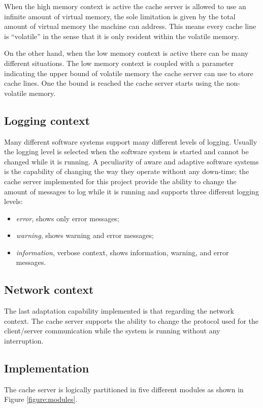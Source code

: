 \documentclass[11pt,a4paper]{article}
\begin{document}
When the high memory context is active the cache server is allowed to use an infinite amount of virtual memory, the sole limitation is given by the total amount of virtual memory the machine can address. This means every cache line is ``volatile'' in the sense that it is only resident within the volatile memory.

On the other hand, when the low memory context is active there can be many different situations. The low memory context is coupled with a parameter indicating the upper bound of volatile memory the cache server can use to store cache lines. One the bound is reached the cache server starts using the non-volatile memory.

\subsection{Logging context}
\label{section:work:logging-context}
Many different software systems support many different levels of logging. Usually the logging level is selected when the software system is started and cannot be changed while it is running. A peculiarity of aware and adaptive software systems is the capability of changing the way they operate without any down-time; the cache server implemented for this project provide the ability to change the amount of messages to log while it is running and supports three different logging levels:
\begin{itemize}
\item \textit{error}, shows only error messages;
\item \textit{warning}, shows warning and error messages;
\item \textit{information}, verbose context, shows information, warning, and error messages.
\end{itemize}

\subsection{Network context}
\label{section:work:network-context}
The last adaptation capability implemented is that regarding the network context. The cache server supports the ability to change the protocol used for the client/server communication while the system is running without any interruption.

\subsection{Implementation}
\label{section:work:implementation}
The cache server is logically partitioned in five different modules as shown in Figure \ref{figure:modules}.
\end{document}
